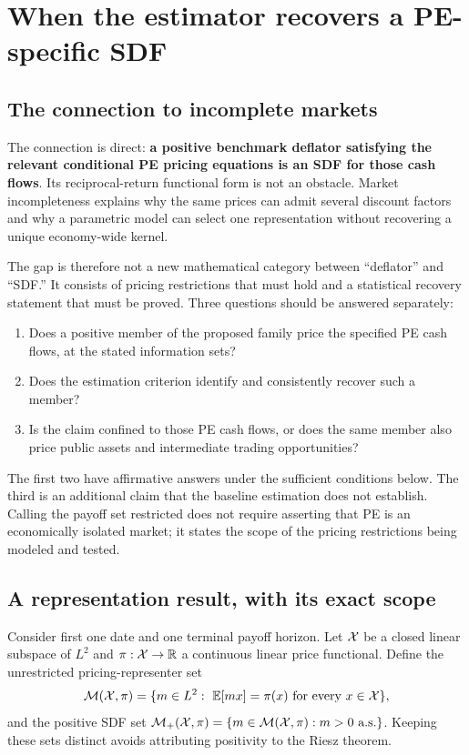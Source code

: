 \documentclass[11pt]{article}
\newcommand{\E}{\mathbb{E}}
\theoremstyle{plain}
\theoremstyle{definition}
\begin{document}
\section{When the estimator recovers a PE-specific SDF}
\label{app:sdf}

\subsection{The connection to incomplete markets}

The connection is direct: \textbf{a positive benchmark deflator satisfying the relevant conditional PE pricing equations is an SDF for those cash flows}. Its reciprocal-return functional form is not an obstacle. Market incompleteness explains why the same prices can admit several discount factors and why a parametric model can select one representation without recovering a unique economy-wide kernel.

The gap is therefore not a new mathematical category between ``deflator'' and ``SDF.'' It consists of pricing restrictions that must hold and a statistical recovery statement that must be proved. Three questions should be answered separately:
\begin{enumerate}
\item Does a positive member of the proposed family price the specified PE cash flows, at the stated information sets?
\item Does the estimation criterion identify and consistently recover such a member?
\item Is the claim confined to those PE cash flows, or does the same member also price public assets and intermediate trading opportunities?
\end{enumerate}
The first two have affirmative answers under the sufficient conditions below. The third is an additional claim that the baseline estimation does not establish. Calling the payoff set restricted does not require asserting that PE is an economically isolated market; it states the scope of the pricing restrictions being modeled and tested.

\subsection{A representation result, with its exact scope}

Consider first one date and one terminal payoff horizon. Let $\mathcal{X}$ be a closed linear subspace of $L^2$ and $\pi:\mathcal{X}\to\mathbb R$ a continuous linear price functional. Define the unrestricted pricing-representer set
\[
\M(\X,\pi)=\{m\in L^2:\ \E[mx]=\pi(x)\text{ for every }x\in\X\},
\]
and the positive SDF set $\mathcal{M}_+(\mathcal{X},\pi)=\{m\in\mathcal{M}(\mathcal{X},\pi):m>0\text{ a.s.}\}$. Keeping these sets distinct avoids attributing positivity to the Riesz theorem.
\end{document}
